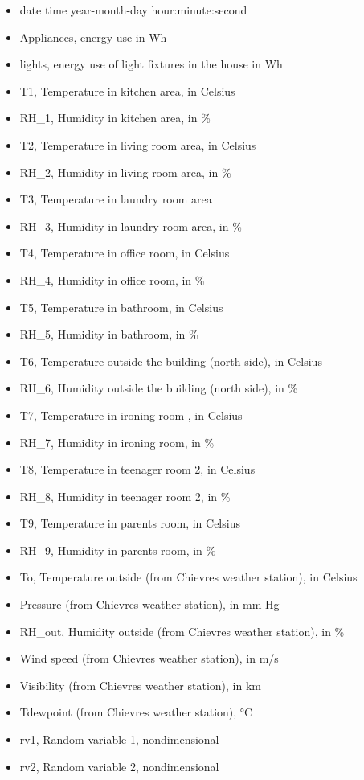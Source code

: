 \documentclass[]{article}
\providecommand{\tightlist}{%
  \setlength{\itemsep}{0pt}\setlength{\parskip}{0pt}}
\begin{document}
\begin{itemize}
\tightlist
\item
  date time year-month-day hour:minute:second
\item
  Appliances, energy use in Wh
\item
  lights, energy use of light fixtures in the house in Wh
\item
  T1, Temperature in kitchen area, in Celsius
\item
  RH\_1, Humidity in kitchen area, in \%
\item
  T2, Temperature in living room area, in Celsius
\item
  RH\_2, Humidity in living room area, in \%
\item
  T3, Temperature in laundry room area
\item
  RH\_3, Humidity in laundry room area, in \%
\item
  T4, Temperature in office room, in Celsius
\item
  RH\_4, Humidity in office room, in \%
\item
  T5, Temperature in bathroom, in Celsius
\item
  RH\_5, Humidity in bathroom, in \%
\item
  T6, Temperature outside the building (north side), in Celsius
\item
  RH\_6, Humidity outside the building (north side), in \%
\item
  T7, Temperature in ironing room , in Celsius
\item
  RH\_7, Humidity in ironing room, in \%
\item
  T8, Temperature in teenager room 2, in Celsius
\item
  RH\_8, Humidity in teenager room 2, in \%
\item
  T9, Temperature in parents room, in Celsius
\item
  RH\_9, Humidity in parents room, in \%
\item
  To, Temperature outside (from Chievres weather station), in Celsius
\item
  Pressure (from Chievres weather station), in mm Hg
\item
  RH\_out, Humidity outside (from Chievres weather station), in \%
\item
  Wind speed (from Chievres weather station), in m/s
\item
  Visibility (from Chievres weather station), in km
\item
  Tdewpoint (from Chievres weather station), °C
\item
  rv1, Random variable 1, nondimensional
\item
  rv2, Random variable 2, nondimensional
\end{itemize}
\end{document}
